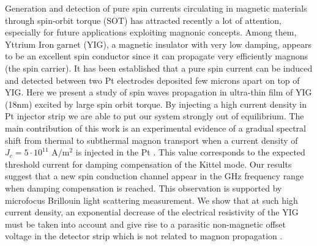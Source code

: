 Generation and detection of pure spin currents circulating in magnetic materials through spin-orbit torque (SOT) has attracted recently a lot of attention, especially for future applications exploiting magnonic concepts. Among them, Yttrium Iron garnet (YIG), a magnetic insulator with very low damping, appears to be an excellent spin conductor \cite{Kajiwara_2010} since it can propagate very efficiently magnons (the spin carrier). It has been established \cite{Cornelissen_2015} that a pure spin current can be induced and detected between two Pt electrodes deposited few microns apart on top of YIG. Here we present a study of spin waves propagation in ultra-thin film of YIG (18nm) excited by large spin orbit torque. By injecting a high current density in Pt injector strip we are able to put our system strongly out of equilibrium. The main contribution of this work is an experimental evidence of a gradual spectral shift from thermal to subthermal magnon transport when a current density of $J_c= 5\cdot 10^{11}$ A$/$m$^2$ is injected in the Pt \cite{1702.05226v3}. This value corresponds to the expected threshold current for damping compensation of the Kittel mode. Our results suggest that a new spin conduction channel appear in the GHz frequency range when damping compensation is reached. This observation is supported by microfocus Brillouin light scattering measurement. We show that at such high current density, an exponential decrease of the electrical resistivity of the YIG must be taken into account and give rise to a parasitic non-magnetic offset voltage in the detector strip which is not related to magnon propagation \cite{1709.07207v1}.
